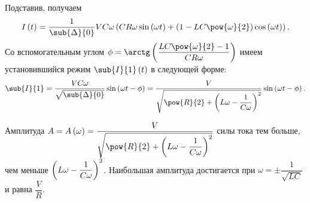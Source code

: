 \documentclass[a5paper,10pt]{article}
\begin{document}
Подставив, получаем
$$I\br{t} 
    = \frac{1}{\sub{\Delta}{0}} VC\omega 
    \br{CR\omega \sin\br{\omega t} 
        + \br{1 - LC\pow{\omega}{2}} \cos\br{\omega t}}.$$
Со вспомогательным углом 
$\phi = \arctg\br{\dfrac{LC\pow{\omega}{2} - 1}{CR\omega}}$
имеем установившийся режим
$\sub{I}{1}\br{t}$ в следующей форме:
$$\sub{I}{1} 
= \frac {VC\omega} {\sqrt{\sub{\Delta}{0}}} \sin\br{\omega t - \phi} 
= \frac {V} {\sqrt{\pow{R}{2} + \br{L\omega - \dfrac {1}{C\omega}}^2}}
    \sin\br{\omega t - \phi}.$$

Амплитуда 
$A = A\br{\omega} 
= \displaystyle \frac {V} {\sqrt{\pow{R}{2} + \br{L\omega - \dfrac {1}{C\omega}}^2}}$
силы тока тем больше, чем меньше 
$\left(\hspace{0.01em}L\omega - \dfrac {1}{C\omega}\hspace{0.01em}\right)^2$.
Наибольшая амплитуда достигается при
$\omega = \pm \dfrac{1}{\sqrt{LC}}$
и равна $\dfrac {V} {R}$.
\end{document}
